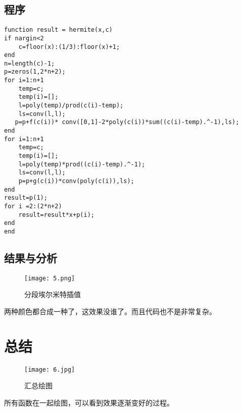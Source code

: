 \documentclass[a4paper,11pt,onecolumn,twoside]{article}
\begin{document}
\subsection{程序}
\begin{lstlisting}
function result = hermite(x,c)
if nargin<2
    c=floor(x):(1/3):floor(x)+1;
end
n=length(c)-1;
p=zeros(1,2*n+2);
for i=1:n+1
    temp=c;
    temp(i)=[];
    l=poly(temp)/prod(c(i)-temp);
    ls=conv(l,l);
   p=p+f(c(i))* conv([0,1]-2*poly(c(i))*sum((c(i)-temp).^-1),ls);
end
for i=1:n+1
    temp=c;
    temp(i)=[];
    l=poly(temp)*prod((c(i)-temp).^-1);
    ls=conv(l,l);
    p=p+g(c(i))*conv(poly(c(i)),ls);
end
result=p(1);
for i =2:(2*n+2)
    result=result*x+p(i);
end
end
\end{lstlisting}
\subsection{结果与分析}
\newpage
\begin{figure}[htbp]
  \centering
  \texttt{[image: 5.png]}
  \caption{分段埃尔米特插值} \label{5}
\end{figure}

两种颜色都合成一种了，这效果没谁了。而且代码也不是非常复杂。

\section{总结}
\begin{figure}[htbp]
  \centering
  \texttt{[image: 6.jpg]}
 \caption{汇总绘图}\label{6}
\end{figure}
所有函数在一起绘图，可以看到效果逐渐变好的过程。
\end{document}
